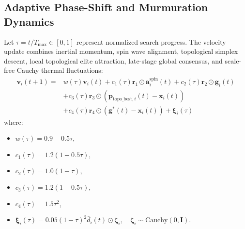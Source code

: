 \documentclass[journal]{IEEEtran}
\begin{document}
\subsection{Adaptive Phase-Shift and Murmuration Dynamics}
Let $\tau = t / T_{\max} \in [0, 1]$ represent normalized search progress. The velocity update combines inertial momentum, spin wave alignment, topological simplex descent, local topological elite attraction, late-stage global consensus, and scale-free Cauchy thermal fluctuations:
\begin{align}
\mathbf{v}_i(t+1) = & w(\tau) \mathbf{v}_i(t) + c_1(\tau) \mathbf{r}_1 \odot \mathbf{a}_i^{\text{spin}}(t) + c_2(\tau) \mathbf{r}_2 \odot \mathbf{g}_i(t) \nonumber \\
& + c_3(\tau) \mathbf{r}_3 \odot (\mathbf{p}_{\text{topo\_best}, i}(t) - \mathbf{x}_i(t)) \nonumber \\
& + c_4(\tau) \mathbf{r}_4 \odot (\mathbf{g}^*(t) - \mathbf{x}_i(t)) + \boldsymbol{\xi}_i(\tau)
\end{align}
where:
\begin{itemize}
    \item $w(\tau) = 0.9 - 0.5 \tau$,
    \item $c_1(\tau) = 1.2 (1 - 0.5 \tau)$,
    \item $c_2(\tau) = 1.0 (1 - \tau)$,
    \item $c_3(\tau) = 1.2 (1 - 0.5 \tau)$,
    \item $c_4(\tau) = 1.5 \tau^2$,
    \item $\boldsymbol{\xi}_i(\tau) = 0.05 (1 - \tau)^2 \bar{d}_i(t) \odot \boldsymbol{\zeta}_i, \quad \boldsymbol{\zeta}_i \sim \text{Cauchy}(0, \mathbf{I})$.
\end{itemize}
\end{document}
